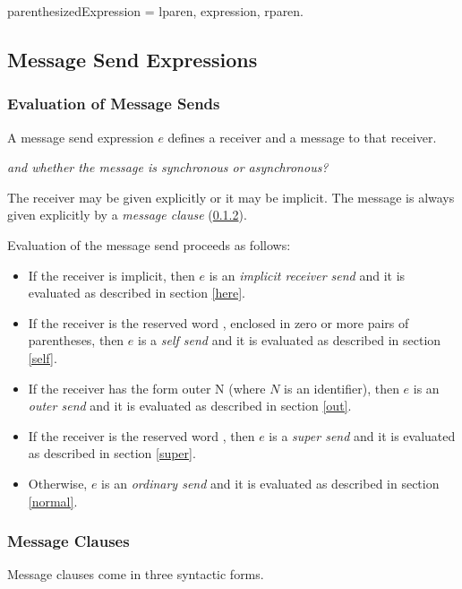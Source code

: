 \documentclass{article}
\newcommand{\code}[1]{{\sf #1}}
\begin{document}
\begin{newspeak}
parenthesizedExpression =  lparen, expression, rparen.
\end{newspeak}

\subsection{Message Send Expressions}
\label{sends}

\subsubsection{Evaluation of Message Sends}
\label{evalMsg}

A message send expression $e$ defines a receiver and a message to that receiver.

{\it and whether the message is  synchronous or asynchronous?}

The receiver may be given explicitly or it may be implicit. The message is always given explicitly by a {\em message clause} (\ref{msgClause}).  

Evaluation of the message send proceeds as follows:
\begin{itemize}
\item
If the receiver is implicit, then $e$ is an {\em implicit receiver send} and it is evaluated as described in section \ref{here}.
\item 
If the receiver is the reserved word \SELF{}, enclosed in zero or more pairs of parentheses, then $e$ is a {\em self send} and it is evaluated as described in section \ref{self}.
\item
If the receiver has the form \code{outer N} (where $N$ is an identifier),  then $e$ is an {\em outer send} and it is evaluated as described in section \ref{out}.
\item
If the receiver is the reserved word \SUPER, then $e$ is a {\em super send} and it is evaluated as described in section \ref{super}.
\item Otherwise, $e$ is an {\em ordinary send} and it is evaluated as described in section \ref{normal}.
\end{itemize}

\subsubsection{Message Clauses}
\label{msgClause}

Message clauses come in three syntactic forms. 
\end{document}
